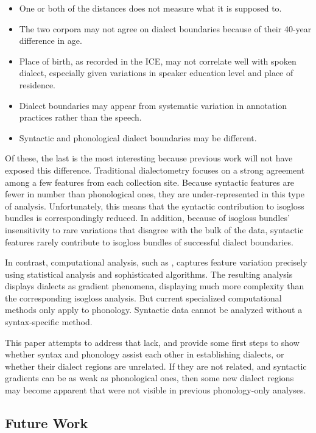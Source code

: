 \documentclass[11pt]{article}
\begin{document}
\begin{itemize}
\item One or both of the distances does not measure what it is supposed to.
\item The two corpora may not agree on dialect boundaries because of
  their 40-year difference in age.
\item Place of birth, as recorded in the ICE, may not correlate well
  with spoken dialect, especially given variations in speaker
  education level and place of residence.
\item Dialect boundaries may appear from systematic variation in
  annotation practices rather than the speech.
\item Syntactic and phonological dialect boundaries may be different.
\end{itemize}

Of these, the last is the most interesting because previous work will
not have exposed this difference. Traditional dialectometry focuses
on a strong agreement among a few features from each collection
site. Because syntactic features are fewer in number than phonological
ones, they are under-represented in this type of
analysis. Unfortunately, this means that the syntactic contribution to
isogloss bundles is correspondingly reduced. In addition, because of
isogloss bundles' insensitivity to rare variations that disagree with
the bulk of the data, syntactic features rarely contribute to
isogloss bundles of successful dialect boundaries.

In contrast, computational analysis, such as \cite{shackleton07},
captures feature variation precisely using statistical analysis and
sophisticated algorithms. The resulting analysis displays dialects as
gradient phenomena, displaying much more complexity than the
corresponding isogloss analysis. But current specialized computational
methods only apply to phonology. Syntactic data cannot be analyzed
without a syntax-specific method.

This paper attempts to address that lack, and provide some first steps
to show whether syntax and phonology assist each other in establishing
dialects, or whether their dialect regions are unrelated. If they are not
related, and syntactic gradients can be as weak as phonological ones,
then some new dialect regions may become apparent that were not visible in
previous phonology-only analyses.

\subsection{Future Work}
\end{document}
